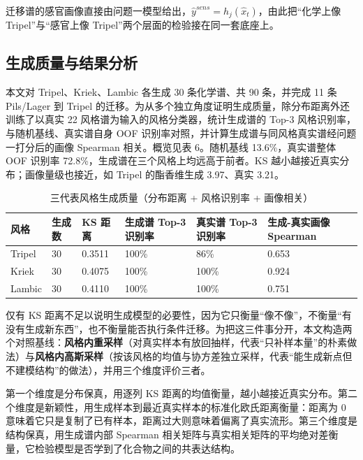 \documentclass[zihao=-4,a4paper,UTF8,fontset=none]{ctexart}
\begin{document}
迁移谱的感官画像直接由问题一模型给出，$\hat y^{sens}=h_j(\hat x_t)$，由此把“化学上像 Tripel”与“感官上像 Tripel”两个层面的检验接在同一套底座上。

\subsection{生成质量与结果分析}
本文对 Tripel、Kriek、Lambic 各生成 30 条化学谱、共 90 条，并完成 11 条 Pils/Lager 到 Tripel 的迁移。为从多个独立角度证明生成质量，除分布距离外还训练了以真实 22 风格谱为输入的风格分类器，统计生成谱的 Top-3 风格识别率，与随机基线、真实谱自身 OOF 识别率对照，并计算生成谱与同风格真实谱经问题一打分后的画像 Spearman 相关。概览见表 6。随机基线 13.6\%，真实谱整体 OOF 识别率 72.8\%，生成谱在三个风格上均远高于前者。KS 越小越接近真实分布；画像量级也接近，如 Tripel 的酯香维生成 3.97、真实 3.21。

\begin{table}[H]
\begin{threeparttable}
\centering
\small
\caption{三代表风格生成质量（分布距离 + 风格识别率 + 画像相关）}
\begin{tabularx}{\textwidth}{@{}LLLLLL@{}}
\toprule
\textbf{风格} & \textbf{生成数} & \textbf{KS 距离} & \textbf{生成谱 Top-3 识别率} & \textbf{真实谱 Top-3 识别率} & \textbf{生成-真实画像 Spearman} \\ \midrule
Tripel & 30 & 0.3511 & 100\% & 86\% & 0.653 \\
Kriek & 30 & 0.4075 & 100\% & 100\% & 0.924 \\
Lambic & 30 & 0.4110 & 100\% & 100\% & 0.751 \\
\bottomrule
\end{tabularx}
\end{threeparttable}
\end{table}

仅有 KS 距离不足以说明生成模型的必要性，因为它只衡量“像不像”，不衡量“有没有生成新东西”，也不衡量能否执行条件迁移。为把这三件事分开，本文构造两个对照基线：\textbf{风格内重采样}（对真实样本有放回抽样，代表“只补样本量”的朴素做法）与\textbf{风格内高斯采样}（按该风格的均值与协方差独立采样，代表“能生成新点但不建模结构”的做法），并用三个维度评价三者。

第一个维度是分布保真，用逐列 KS 距离的均值衡量，越小越接近真实分布。第二个维度是新颖性，用生成样本到最近真实样本的标准化欧氏距离衡量：距离为 0 意味着它只是复制了已有样本，距离过大则意味着偏离了真实流形。第三个维度是结构保真，用生成谱内部 Spearman 相关矩阵与真实相关矩阵的平均绝对差衡量，它检验模型是否学到了化合物之间的共表达结构。
\end{document}
